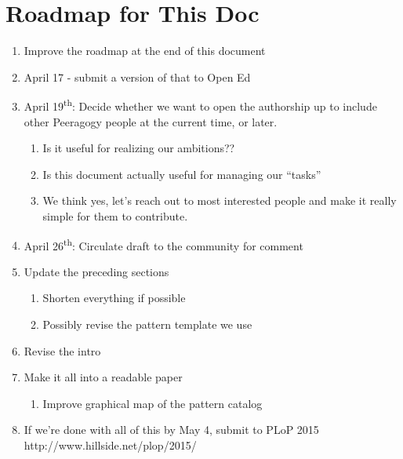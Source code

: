 \section{Roadmap for This Doc}

\begin{enumerate}
\item Improve the roadmap at the end of this document
\item April 17 - submit a version of that to Open Ed
\item April 19\textsuperscript{th}: Decide whether we want to open the authorship up to include other Peeragogy people at the current time, or later. 
\begin{enumerate}
\item Is it useful for realizing our ambitions??
\item Is this document actually useful for managing our ``tasks''
\item We think yes, let's reach out to most interested people and make it really simple for them to contribute.
\end{enumerate}
\item April 26\textsuperscript{th}: Circulate draft to the community for comment
\item Update the preceding sections
\begin{enumerate}
\item Shorten everything if possible
\item Possibly revise the pattern template we use
\end{enumerate}
\item Revise the intro
\item Make it all into a readable paper
\begin{enumerate}
\item Improve graphical map of the pattern catalog
\end{enumerate}
\item If we're done with all of this by May 4, submit to PLoP 2015 http://www.hillside.net/plop/2015/
\end{enumerate}